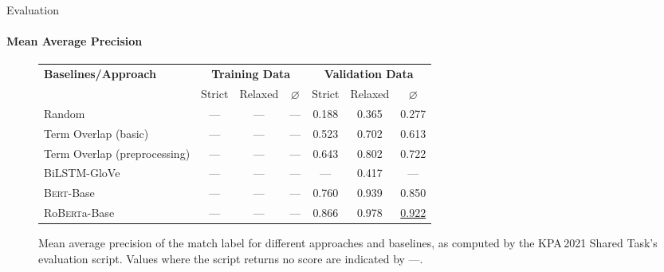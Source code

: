 \documentclass[english,handout]{mlutalk}
\newcommand{\BiLSTM}{\mbox{BiLSTM}\xspace}
\newcommand{\Bert}{\textsc{Bert}\xspace}
\newcommand{\BertBase}{\Bert-Base\xspace}
\newcommand{\Roberta}{\mbox{Ro\textsc{Bert}a}\xspace}
\newcommand{\RobertaBase}{\Roberta-Base\xspace}
\begin{document}
\begin{frame}{Evaluation}
  \framesubtitle{Mean Average Precision}
  \begin{figure}
    \centering
    \caption{Mean average precision of the match label for different approaches and baselines, as computed by the KPA\,2021 Shared Task's evaluation script.
    Values where the script returns no score are indicated by ---.}
    \scriptsize
    \begin{tabular}{lcccccc}
      \toprule
      \textbf{Baselines/Approach} & \multicolumn{3}{c}{\textbf{Training Data}} & \multicolumn{3}{c}{\textbf{Validation Data}} \\
      \cmidrule(r{0.5em}){2-4} \cmidrule(l{0.5em}){5-7}
      & Strict & Relaxed & \(\varnothing\) & Strict & Relaxed & \(\varnothing\) \\
      \midrule
      Random 
      & --- & --- & --- & 0.188 & 0.365 & 0.277 \\
      Term Overlap (basic)
      & --- & --- & --- & 0.523 & 0.702 & 0.613 \\
      Term Overlap (preprocessing)
      & --- & --- & --- & 0.643 & 0.802 & 0.722 \\
      \midrule
      \BiLSTM-GloVe
      & --- & --- & --- & --- & 0.417 & --- \\
      \BertBase
      & --- & --- & --- & 0.760 & 0.939 & 0.850 \\
      \RobertaBase
      & --- & --- & --- & 0.866 & 0.978 & \underline{0.922} \\
      \bottomrule
    \end{tabular}
  \end{figure}
\end{frame}
\end{document}
